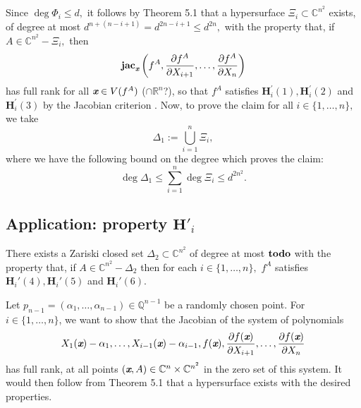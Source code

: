 \documentclass[sigconf]{acmart}
\def\td{{\bf todo}}
\def\xb{\textit{\textbf{x}}}
\def\C{\mathbb{C}}
\def\Q{\mathbb{Q}}
\def\R{\mathbb{R}}
\def\jac{ \textbf{jac}}
\def\pa{\partial}
\begin{document}
%
Since $\deg \Phi_i \leq d,$ it follows by Theorem 5.1 that a hypersurface $\Xi_i \subset \C^{n^2}$ exists, of degree at most $d^{n+(n-i+1)}=d^{2n-i+1}\leq d^{2n},$ with the property that, if $A \in \C^{n^2}-\Xi_i,$ then 
%
\[
 \jac_\xb \left(f^A,\frac{\pa f^A}{\pa X_{i+1}},\hdots,\frac{\pa f^A}{\pa X_n}\right)
\]
has full rank for all $\xb \in V(f^A)$ ($\cap \R^n$?), so that  $f^A$ satisfies $\textbf{H}_i^{'}(1),\textbf{H}_i^{'}(2)$ and $\textbf{H}_i^{'}(3)$ by the Jacobian criterion \cite[Theorem 16.19]{ECA}. Now, to prove the claim for all $i \in \{1,\hdots,n\},$ we take
\[
\Delta_1 := \bigcup_{i=1}^n \Xi_i,
\]
where we have the following bound on the degree which proves the claim:
\[
\deg \Delta_1 \leq \sum_{i=1}^n \deg \Xi_i  \leq d^{2n^2}.
\] 


\subsection{Application: property $\textbf{H}'_i$}

\begin{theorem}
  There exists a Zariski closed set $\Delta_2 \subset \C^{n^2}$ of
  degree at most $\td$ with the property that, if $A \in \C^{n^2} -
  \Delta_2$ then for each $i \in \{1,\hdots,n\},$ $f^A$ satisfies
  $\textbf{H}_i'(4),\textbf{H}_i'(5)$ and $\textbf{H}_i'(6)$.
\end{theorem}

Let $p_{n-1} = (\alpha_1,\hdots,\alpha_{n-1}) \in \Q^{n-1}$ be a randomly chosen point. For $i \in \{1,\hdots,n\}$, we want to show that the Jacobian of the system of polynomials
\[
X_1(\xb)-\alpha_1,\hdots,X_{i-1}(\xb)-\alpha_{i-1}, f(\xb),  \frac{\pa f(\xb)}{\pa X_{i+1}},\hdots,\frac{\pa f(\xb)}{\pa X_n}
\]
has full rank, at all points $(\xb,A) \in \C^n \times \C^{n^2}$ in the zero set of this system. It would then follow from Theorem 5.1 that a hypersurface  exists with the desired properties. 
\end{document}
